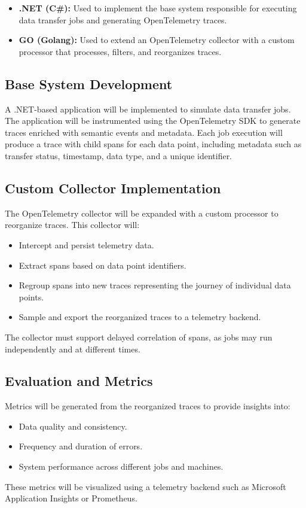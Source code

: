\begin{itemize}
    \item \textbf{.NET (C\#):} Used to implement the base system responsible for executing data transfer jobs and generating OpenTelemetry traces.
    \item \textbf{GO (Golang):} Used to extend an OpenTelemetry collector with a custom processor that processes, filters, and reorganizes traces.
\end{itemize}

\subsection{Base System Development}
A .NET-based application will be implemented to simulate data transfer jobs.
The application will be instrumented using the OpenTelemetry SDK to generate traces 
enriched with semantic events and metadata.
Each job execution will produce a trace with child spans for each data point,
including metadata such as transfer status, timestamp, data type, and a unique identifier.

\subsection{Custom Collector Implementation}
The OpenTelemetry collector will be expanded with a custom processor to reorganize traces.
This collector will:

\begin{itemize}
    \item Intercept and persist telemetry data.
    \item Extract spans based on data point identifiers.
    \item Regroup spans into new traces representing the journey of individual data points.
    \item Sample and export the reorganized traces to a telemetry backend.
\end{itemize}
The collector must support delayed correlation of spans, as jobs may run independently and at different times.

\subsection{Evaluation and Metrics}
Metrics will be generated from the reorganized traces to provide insights into:
\begin{itemize}
    \item Data quality and consistency.
    \item Frequency and duration of errors.
    \item System performance across different jobs and machines.
\end{itemize}
These metrics will be visualized using a telemetry backend such as Microsoft Application Insights or Prometheus.
